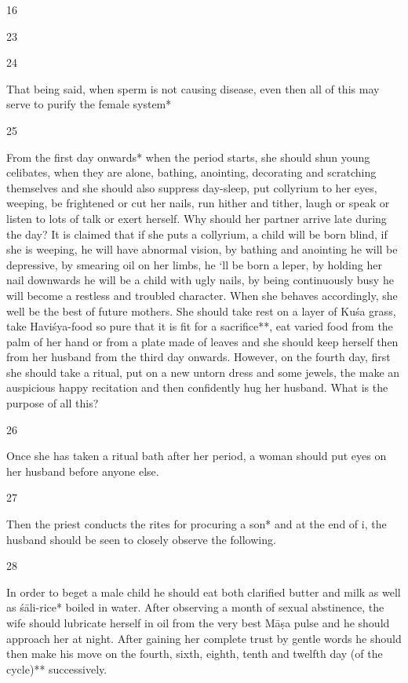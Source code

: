 \begin{translation}
\begin{tt}
\item[16]


\item[23]


  
\item[24]

That being said, when sperm is not causing disease, even then all of this 
  may serve to purify the female system*
  
\item[25]

From the first day onwards* when the period starts, she  should shun 
  young celibates, when they are alone, bathing, anointing, decorating and 
  scratching themselves and she should also suppress day-sleep, put collyrium to 
  her eyes, weeping, be frightened or cut her nails, run hither and tither, laugh or 
  speak or listen to lots of talk or exert herself. Why should her partner arrive 
  late during the day? It is claimed that if she puts a collyrium, a child will be born 
  blind, if she is weeping, he will have abnormal vision, by bathing and anointing 
  he will be depressive, by smearing oil on her limbs, he ‘ll be born a leper, by 
  holding her nail downwards he will be a child with ugly nails, by being 
  continuously busy he will become a restless and troubled character. When she 
  behaves accordingly, she well be the best of future mothers. She should take 
  rest on a layer of Kuśa  grass,  take Haviśya-food so pure that it is fit for a 
  sacrifice**, eat varied food from the palm of her hand or from a plate made of 
  leaves and she should keep herself then from her husband from the third day 
  onwards. However, on the fourth day, first she should take a ritual, put on a 
  new untorn dress and some jewels, the make an auspicious happy recitation 
  and then confidently hug her husband. What is the purpose of all this?
  
\item[26]

Once she has taken a ritual bath after her period, a woman should put 
  eyes on her husband before anyone else.
  
\item[27]

Then the priest conducts the rites for procuring a son* and at the end of 
  i, the husband should be seen to closely observe the following.
  
\item[28]

 In order to beget a male child he should eat both clarified butter and 
  milk as well as śāli-rice* boiled in water. After observing a month of sexual 
  abstinence, the wife should lubricate herself in oil from the very best Māṣa 
  pulse and he should approach her at night. After gaining her complete trust by 
  gentle words he should then make his move on the fourth, sixth, eighth, tenth 
  and twelfth day (of the cycle)** successively.
  

\end{tt}
\end{translation}
